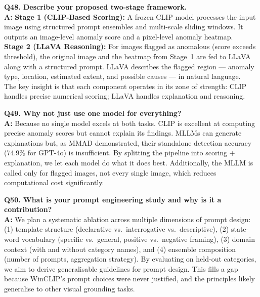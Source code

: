 \documentclass[12pt, a4paper]{article}
\begin{document}
\begin{qa}
\textbf{Q48. Describe your proposed two-stage framework.}\\[4pt]
\textbf{A:} \textbf{Stage 1 (CLIP-Based Scoring):} A frozen CLIP model processes the input image using structured prompt ensembles and multi-scale sliding windows. It outputs an image-level anomaly score and a pixel-level anomaly heatmap.\\[3pt]
\textbf{Stage 2 (LLaVA Reasoning):} For images flagged as anomalous (score exceeds threshold), the original image and the heatmap from Stage~1 are fed to LLaVA along with a structured prompt. LLaVA describes the flagged region --- anomaly type, location, estimated extent, and possible causes --- in natural language.\\[3pt]
The key insight is that each component operates in its zone of strength: CLIP handles precise numerical scoring; LLaVA handles explanation and reasoning.
\end{qa}

\begin{qa}
\textbf{Q49. Why not just use one model for everything?}\\[4pt]
\textbf{A:} Because no single model excels at both tasks. CLIP is excellent at computing precise anomaly scores but cannot explain its findings. MLLMs can generate explanations but, as MMAD demonstrated, their standalone detection accuracy (74.9\% for GPT-4o) is insufficient. By splitting the pipeline into scoring + explanation, we let each model do what it does best. Additionally, the MLLM is called only for flagged images, not every single image, which reduces computational cost significantly.
\end{qa}

\begin{qa}
\textbf{Q50. What is your prompt engineering study and why is it a contribution?}\\[4pt]
\textbf{A:} We plan a systematic ablation across multiple dimensions of prompt design: (1) template structure (declarative vs.\ interrogative vs.\ descriptive), (2) state-word vocabulary (specific vs.\ general, positive vs.\ negative framing), (3) domain context (with and without category names), and (4) ensemble composition (number of prompts, aggregation strategy). By evaluating on held-out categories, we aim to derive generalisable guidelines for prompt design. This fills a gap because WinCLIP's prompt choices were never justified, and the principles likely generalise to other visual grounding tasks.
\end{qa}
\end{document}
